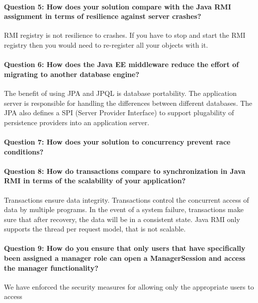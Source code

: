 \documentclass{ds-report}
\begin{document}
	\paragraph{Question 5: How does your solution compare with the Java RMI assignment in terms of resilience against server crashes?\\} 
	RMI registry is not resilience to crashes. If you have to stop and start the RMI registry then you would need to re-register all your objects with it.
	
	\paragraph{Question 6: How does the Java EE middleware reduce the effort of migrating to another database engine?\\} 
		The benefit of using JPA and JPQL is database portability. The application server is responsible for handling the differences between different databases. The JPA also defines a SPI (Server Provider Interface) to support plugability of persistence providers into an application server.
		
	\paragraph{Question 7: How does your solution to concurrency prevent race conditions?\\} 
	
	\paragraph{Question 8: How do transactions compare to synchronization in Java RMI in terms of the scalability of your application?\\} 
	Transactions ensure data integrity. Transactions control the concurrent access of data by multiple programs. In the event of a system failure, transactions make sure that after recovery, the data will be in a consistent state. Java RMI only supports the thread per request model, that is not scalable.
	
	\paragraph{Question 9: How do you ensure that only users that have specifically been assigned a manager role can open a ManagerSession and access the manager functionality?\\} 
	We have enforced the security measures for allowing only the appropriate users to access 
	
\end{document}
